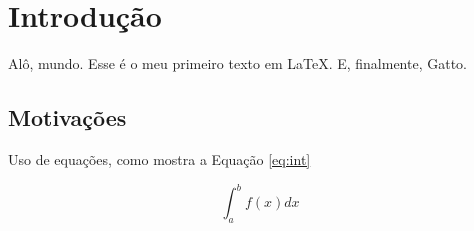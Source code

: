 \documentclass[a4paper]{report}
\begin{document}
\tableofcontents

\chapter{Introdução}

Alô, mundo. Esse é o meu primeiro texto em LaTeX.
E, finalmente, Gatto.

\section{Motivações}

Uso de equações, como mostra a Equação \ref{eq:int}

\begin{equation}
  \label{eq:int}
  \int_a^b f(x) dx
\end{equation}
\end{document}
